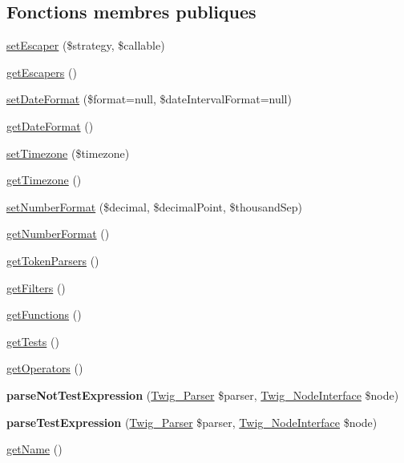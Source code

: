 \subsection*{Fonctions membres publiques}
\begin{DoxyCompactItemize}
\item 
\hyperlink{class_twig___extension___core_ab8c5bf7d560b39ae420e3131d6cc64c4}{set\+Escaper} (\$strategy, \$callable)
\item 
\hyperlink{class_twig___extension___core_a98b08ee8d76d2e8b51f88aadf54c57f3}{get\+Escapers} ()
\item 
\hyperlink{class_twig___extension___core_a918c0c32f566071adc9b5258a2ab6fca}{set\+Date\+Format} (\$format=null, \$date\+Interval\+Format=null)
\item 
\hyperlink{class_twig___extension___core_ac8d28832fbeea9d3a9e4e591c9af4c93}{get\+Date\+Format} ()
\item 
\hyperlink{class_twig___extension___core_ac1b4cf4ebad277081311189dffb821f2}{set\+Timezone} (\$timezone)
\item 
\hyperlink{class_twig___extension___core_a23e87a365ef1aea5bc5fdad51d8925ae}{get\+Timezone} ()
\item 
\hyperlink{class_twig___extension___core_a10cf675b0b6476d7a25fbcaa40206fa0}{set\+Number\+Format} (\$decimal, \$decimal\+Point, \$thousand\+Sep)
\item 
\hyperlink{class_twig___extension___core_a7ac6ceb09817aef826280cdbad8bb3a8}{get\+Number\+Format} ()
\item 
\hyperlink{class_twig___extension___core_a8fd35903c3d01c0f0078f59d142eb063}{get\+Token\+Parsers} ()
\item 
\hyperlink{class_twig___extension___core_a428d91319fc73d3038784cf5436936b6}{get\+Filters} ()
\item 
\hyperlink{class_twig___extension___core_a131c2522f07821f77cd1d038c216031b}{get\+Functions} ()
\item 
\hyperlink{class_twig___extension___core_a7e247dd31cc8d37a6c97353a062a0080}{get\+Tests} ()
\item 
\hyperlink{class_twig___extension___core_aeaf58da661970280d00b67c17dc4f8d4}{get\+Operators} ()
\item 
{\bfseries parse\+Not\+Test\+Expression} (\hyperlink{class_twig___parser}{Twig\+\_\+\+Parser} \$parser, \hyperlink{interface_twig___node_interface}{Twig\+\_\+\+Node\+Interface} \$node)\hypertarget{class_twig___extension___core_aa5aa08c4d358ee4f05807171b0f0dfa6}{}\label{class_twig___extension___core_aa5aa08c4d358ee4f05807171b0f0dfa6}

\item 
{\bfseries parse\+Test\+Expression} (\hyperlink{class_twig___parser}{Twig\+\_\+\+Parser} \$parser, \hyperlink{interface_twig___node_interface}{Twig\+\_\+\+Node\+Interface} \$node)\hypertarget{class_twig___extension___core_a78fa1e8423be18294d6c15308ca4c9da}{}\label{class_twig___extension___core_a78fa1e8423be18294d6c15308ca4c9da}

\item 
\hyperlink{class_twig___extension___core_a3d0963e68bb313b163a73f2803c64600}{get\+Name} ()
\end{DoxyCompactItemize}
